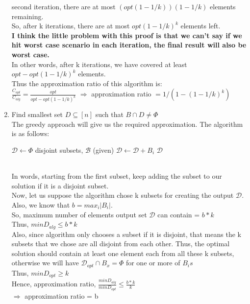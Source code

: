 \documentclass[11pt]{article}
\begin{document}
\begin{enumerate}
second iteration, there are at most $(opt(1 - 1/k))(1 - 1/k)$ elements remaining. \\
So, after k iterations, there are at most $opt(1 - 1/k)^k$ elements left. \\
{\bf I think the little problem with this proof is that we can't say if we hit worst case scenario in each iteration, the final result will also be worst case.} \\
In other words, after k iterations, we have covered at least $opt - opt(1 - 1/k)^k$ elements. \\
Thus the approximation ratio of this algorithm is: \\
$\frac{C_{opt}}{C_{alg}} = \frac{opt}{opt - opt(1- 1/k)^k} $
$\Longrightarrow$ approximation ratio $= 1/(1 - (1 - 1/k)^k)$

    \item Find smallest set $D \subseteq [n]$ such that $B \cap D \neq \Phi $ \\
    The greedy approach will give us the required approximation. The algorithm is as follows:   
    \begin{algorithm}
  \begin{algorithmic}
      \State $\mathcal{D} \leftarrow \Phi$
      \State disjoint subsets, $\mathcal{B}$ (given)
            \State $\mathcal{D} \leftarrow \mathcal{D} + B_i$
         \EndIf
        \EndFor
      \State \Return $\mathcal{D}$
    \EndFunction
  \end{algorithmic}
\end{algorithm}\\
In words, starting from the first subset, keep adding the subset to our solution if it is a disjoint subset. \\
Now, let us suppose the algorithm chose k subsets for creating the output $\mathcal{D}$. Also, we know that $b = max_i |B_i|$. \\
So, maximum number of elements output set $\mathcal{D}$ can contain = $b*k$\\
Thus, $minD_{alg} \leq b*k$ \\
Also, since algorithm only chooses a subset if it is disjoint, that means the k subsets that we chose are all disjoint from each other. 
Thus, the optimal solution should contain at least one element each from all these k subsets, otherwise we will have $\mathcal{D}_{opt} 
\cap B_x = \Phi$ for one or more of $B_i s$\\
Thus, $minD_{opt} \geq k$ \\
Hence, approximation ratio, $\frac{minD_{alg}}{minD_{opt}} \leq \frac{b*k}{k}$ \\
$\Longrightarrow$ approximation ratio = b
\end{enumerate}
\end{document}
